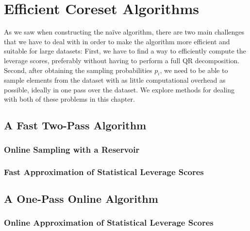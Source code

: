 \section{Efficient Coreset Algorithms}

As we saw when constructing the na\"ive algorithm, there are two
main challenges that we have to deal with in order to make the
algorithm more efficient and suitable for large datasets:
First, we have to find a way to efficiently compute the
leverage scores, preferably without
having to perform a full QR decomposition.
Second, after obtaining the sampling probabilities $p_i$, we
need to be able to sample elements from the dataset
with as little computational overhead as possible, ideally
in one pass over the dataset.
We explore methods for dealing with both of these problems in this
chapter.

\subsection{A Fast Two-Pass Algorithm}

\subsubsection{Online Sampling with a Reservoir}

\cite{reservoir-sampler}

\subsubsection{Fast Approximation of Statistical Leverage Scores}

\subsection{A One-Pass Online Algorithm}

\subsubsection{Online Approximation of Statistical Leverage Scores}
